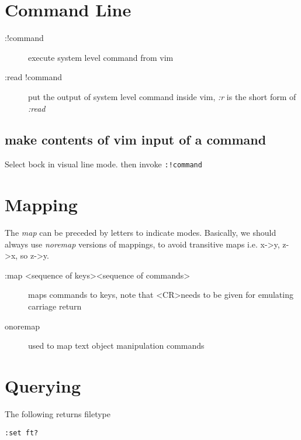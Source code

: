 \documentclass[a4paper, 12pt]{article}
\begin{document}
\section{Command Line}
\begin{description}
	\item[:!command] execute system level command from vim	
	\item[:read !command] put the output of system level command inside vim, \emph{:r} is the short form of \emph{:read}
\end{description}

\subsection{make contents of vim input of a command}
Select bock in visual line mode. then invoke \verb|:!command|

\section{Mapping}
The \emph{map} can be preceded by letters to indicate modes. Basically, we should always use \emph{noremap} versions of mappings, to avoid transitive maps i.e. x->y, z->x, so z->y.
\begin{description}
	\item[:map \textless sequence of keys\textgreater \textless sequence of commands\textgreater] maps commands to keys, note that \textless CR\textgreater needs to be given for emulating carriage return
	\item[onoremap] used to map text object manipulation commands
\end{description}

\section{Querying}
The following returns filetype
\begin{verbatim}
:set ft?
\end{verbatim}

\end{document}
